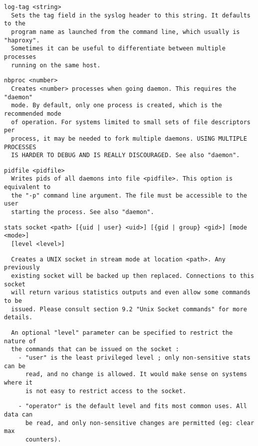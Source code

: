 \begin{verbatim}
log-tag <string>
  Sets the tag field in the syslog header to this string. It defaults to the
  program name as launched from the command line, which usually is "haproxy".
  Sometimes it can be useful to differentiate between multiple processes
  running on the same host.
\end{verbatim}

\begin{verbatim}
nbproc <number>
  Creates <number> processes when going daemon. This requires the "daemon"
  mode. By default, only one process is created, which is the recommended mode
  of operation. For systems limited to small sets of file descriptors per
  process, it may be needed to fork multiple daemons. USING MULTIPLE PROCESSES
  IS HARDER TO DEBUG AND IS REALLY DISCOURAGED. See also "daemon".
\end{verbatim}

\begin{verbatim}
pidfile <pidfile>
  Writes pids of all daemons into file <pidfile>. This option is equivalent to
  the "-p" command line argument. The file must be accessible to the user
  starting the process. See also "daemon".
\end{verbatim}

\begin{verbatim}
stats socket <path> [{uid | user} <uid>] [{gid | group} <gid>] [mode <mode>]
  [level <level>]
\end{verbatim}

\begin{verbatim}
  Creates a UNIX socket in stream mode at location <path>. Any previously
  existing socket will be backed up then replaced. Connections to this socket
  will return various statistics outputs and even allow some commands to be
  issued. Please consult section 9.2 "Unix Socket commands" for more details.
\end{verbatim}

\begin{verbatim}
  An optional "level" parameter can be specified to restrict the nature of
  the commands that can be issued on the socket :
    - "user" is the least privileged level ; only non-sensitive stats can be
      read, and no change is allowed. It would make sense on systems where it
      is not easy to restrict access to the socket.
\end{verbatim}

\begin{verbatim}
    - "operator" is the default level and fits most common uses. All data can
      be read, and only non-sensitive changes are permitted (eg: clear max
      counters).
\end{verbatim}

